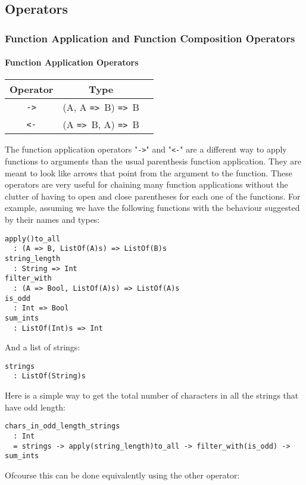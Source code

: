 \documentclass{article}
\def\ra{\texttt{=>}\ }
\begin{document}
\subsection{Operators}

\subsubsection{Function Application and Function Composition Operators}

\paragraph{Function Application Operators}

\begin{center}
\begin{tabular}{ |c|c|c| } 
\hline
Operator & Type \\ 
\hline
\hline
\texttt{->} & (A, A \ra B) \ra B \\
\hline
\texttt{<-} & (A \ra B, A) \ra B \\
\hline
\end{tabular}
\end{center}
The function application operators "\texttt{->}" and "\texttt{<-}" are a
different way to apply functions to arguments than the usual parenthesis
function application.  They are meant to look like arrows that point from the
argument to the function.  These operators are very useful for chaining many
function applications without the clutter of having to open and close
parentheses for each one of the functions.  For example, assuming we have the
following functions with the behaviour suggested by their names and types:
\begin{verbatim}
apply()to_all
  : (A => B, ListOf(A)s) => ListOf(B)s
string_length
  : String => Int
filter_with
  : (A => Bool, ListOf(A)s) => ListOf(A)s
is_odd
  : Int => Bool
sum_ints
  : ListOf(Int)s => Int
\end{verbatim}
And a list of strings:
\begin{verbatim}
strings
  : ListOf(String)s
\end{verbatim}
Here is a simple way to get the total number of characters in all the strings
that have odd length:
\begin{verbatim}
chars_in_odd_length_strings
  : Int
  = strings -> apply(string_length)to_all -> filter_with(is_odd) -> sum_ints
\end{verbatim}
Ofcourse this can be done equivalently using the other operator:
\end{document}
